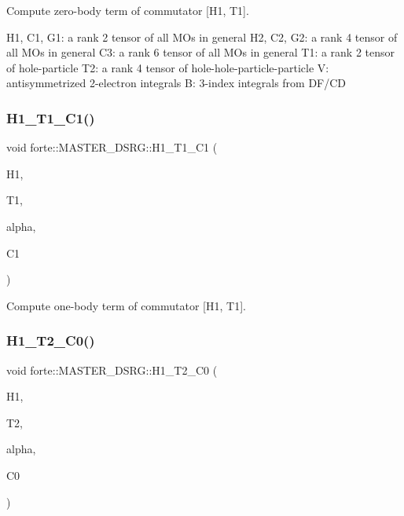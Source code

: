 Compute zero-\/body term of commutator \mbox{[}H1, T1\mbox{]}. 

H1, C1, G1\+: a rank 2 tensor of all M\+Os in general H2, C2, G2\+: a rank 4 tensor of all M\+Os in general C3\+: a rank 6 tensor of all M\+Os in general T1\+: a rank 2 tensor of hole-\/particle T2\+: a rank 4 tensor of hole-\/hole-\/particle-\/particle V\+: antisymmetrized 2-\/electron integrals B\+: 3-\/index integrals from D\+F/\+CD \mbox{\label{classforte_1_1_m_a_s_t_e_r___d_s_r_g_a92d17334220a1ec7d2572322549c780c}} 
\subsubsection{\texorpdfstring{H1\+\_\+\+T1\+\_\+\+C1()}{H1\_T1\_C1()}}
{\footnotesize\ttfamily void forte\+::\+M\+A\+S\+T\+E\+R\+\_\+\+D\+S\+R\+G\+::\+H1\+\_\+\+T1\+\_\+\+C1 (\begin{DoxyParamCaption}\item[{Blocked\+Tensor \&}]{H1,  }\item[{Blocked\+Tensor \&}]{T1,  }\item[{const double \&}]{alpha,  }\item[{Blocked\+Tensor \&}]{C1 }\end{DoxyParamCaption})\hspace{0.3cm}{\ttfamily [protected]}}



Compute one-\/body term of commutator \mbox{[}H1, T1\mbox{]}. 

\mbox{\label{classforte_1_1_m_a_s_t_e_r___d_s_r_g_aaf832988d33d384cafc0d1539160cadb}} 
\subsubsection{\texorpdfstring{H1\+\_\+\+T2\+\_\+\+C0()}{H1\_T2\_C0()}}
{\footnotesize\ttfamily void forte\+::\+M\+A\+S\+T\+E\+R\+\_\+\+D\+S\+R\+G\+::\+H1\+\_\+\+T2\+\_\+\+C0 (\begin{DoxyParamCaption}\item[{Blocked\+Tensor \&}]{H1,  }\item[{Blocked\+Tensor \&}]{T2,  }\item[{const double \&}]{alpha,  }\item[{double \&}]{C0 }\end{DoxyParamCaption})\hspace{0.3cm}{\ttfamily [protected]}}



